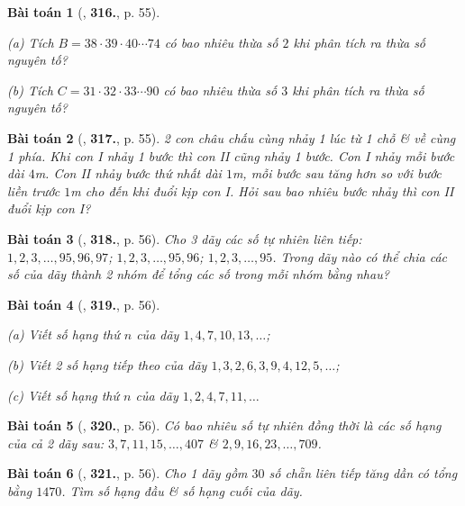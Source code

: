 \documentclass{article}
\numberwithin{equation}{section}
\newtheorem{baitoan}{Bài toán}
\begin{document}
\begin{baitoan}[\cite{Binh_Toan_6_tap_1}, \textbf{316.}, p. 55]
	\begin{enumerate*}
		\item[(a)] Tích $B = 38\cdot 39\cdot 40\cdots 74$ có bao nhiêu thừa số $2$ khi phân tích ra thừa số nguyên tố?
		\item[(b)] Tích $C = 31\cdot 32\cdot 33\cdots 90$ có bao nhiêu thừa số $3$ khi phân tích ra thừa số nguyên tố?
	\end{enumerate*}
\end{baitoan}

\begin{baitoan}[\cite{Binh_Toan_6_tap_1}, \textbf{317.}, p. 55]
	2 con châu chấu cùng nhảy 1 lúc từ 1 chỗ \& về cùng 1 phía. Khi con I nhảy 1 bước thì con II cũng nhảy 1 bước. Con I nhảy mỗi bước dài $4$\emph{m}. Con II nhảy bước thứ nhất dài $1$\emph{m}, mỗi bước sau tăng hơn so với bước liền trước $1$\emph{m} cho đến khi đuổi kịp con I. Hỏi sau bao nhiêu bước nhảy thì con II đuổi kịp con I?
\end{baitoan}

\begin{baitoan}[\cite{Binh_Toan_6_tap_1}, \textbf{318.}, p. 56]
	Cho 3 dãy các số tự nhiên liên tiếp: $1,2,3,\ldots,95,96,97$; $1,2,3,\dots,95,96$; $1,2,3,\ldots,95$. Trong dãy nào có thể chia các số của dãy thành 2 nhóm để tổng các số trong mỗi nhóm bằng nhau?
\end{baitoan}

\begin{baitoan}[\cite{Binh_Toan_6_tap_1}, \textbf{319.}, p. 56]
	\begin{enumerate*}
		\item[(a)] Viết số hạng thứ $n$ của dãy $1,4,7,10,13,\ldots$;
		\item[(b)] Viết 2 số hạng tiếp theo của dãy $1,3,2,6,3,9,4,12,5,\ldots$;
		\item[(c)] Viết số hạng thứ $n$ của dãy $1,2,4,7,11,\ldots$
	\end{enumerate*}
\end{baitoan}

\begin{baitoan}[\cite{Binh_Toan_6_tap_1}, \textbf{320.}, p. 56]
	Có bao nhiêu số tự nhiên đồng thời là các số hạng của cả 2 dãy sau: $3,7,11,15,\ldots,407$ \& $2,9,16,23,\ldots,709$.
\end{baitoan}

\begin{baitoan}[\cite{Binh_Toan_6_tap_1}, \textbf{321.}, p. 56]
	Cho 1 dãy gồm $30$ số chẵn liên tiếp tăng dần có tổng bằng $1470$. Tìm số hạng đầu \& số hạng cuối của dãy.
\end{baitoan}
\end{document}
